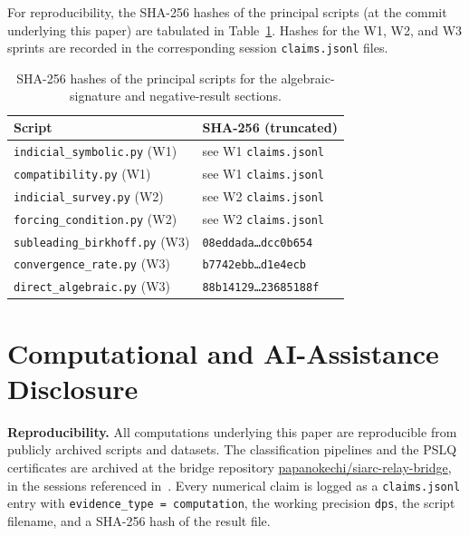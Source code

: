 \documentclass[11pt]{amsart}
\theoremstyle{definition}
\theoremstyle{remark}
\begin{document}
For reproducibility, the SHA-256 hashes of the principal scripts
(at the commit underlying this paper) are tabulated in
Table~\ref{tab:hashes}.  Hashes for the W1, W2, and W3 sprints are
recorded in the corresponding session \texttt{claims.jsonl} files.

\begin{table}[t]
\centering
\caption{SHA-256 hashes of the principal scripts for the
algebraic-signature and negative-result sections.}
\label{tab:hashes}
\begin{tabular}{ll}
\toprule
Script & SHA-256 (truncated) \\
\midrule
\texttt{indicial\_symbolic.py} (W1) & see W1 \texttt{claims.jsonl} \\
\texttt{compatibility.py} (W1) & see W1 \texttt{claims.jsonl} \\
\texttt{indicial\_survey.py} (W2) & see W2 \texttt{claims.jsonl} \\
\texttt{forcing\_condition.py} (W2) & see W2 \texttt{claims.jsonl} \\
\texttt{subleading\_birkhoff.py} (W3) & \texttt{08eddada\dots dcc0b654} \\
\texttt{convergence\_rate.py} (W3) & \texttt{b7742ebb\dots d1e4ecb} \\
\texttt{direct\_algebraic.py} (W3) & \texttt{88b14129\dots 23685188f} \\
\bottomrule
\end{tabular}
\end{table}

\section*{Computational and AI-Assistance Disclosure}

\textbf{Reproducibility.}  All computations underlying this paper
are reproducible from publicly archived scripts and datasets.  The
classification pipelines and the PSLQ certificates are archived at
the bridge repository
\href{https://github.com/papanokechi/siarc-relay-bridge}%
{papanokechi/siarc-relay-bridge}, in the sessions referenced
in~\cite{TRINote, SprintW1Report, SprintW2Report, SprintW3Report}.
Every numerical claim is logged as a \texttt{claims.jsonl} entry
with \texttt{evidence\_type = computation}, the working precision
\texttt{dps}, the script filename, and a SHA-256 hash of the result
file.
\end{document}
